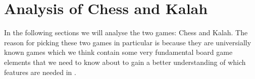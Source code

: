 \section{Analysis of Chess and Kalah}
\label{sec:chessandkalah}

In the following sections we will analyse the two games: Chess and Kalah. The
reason for picking these two games in particular is because they are
universially known games which we think contain some very fundamental board game
elements that we need to know about to gain a better understanding of which
features are needed in \productname{}.


  

